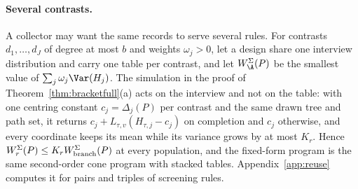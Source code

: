 \paragraph{Several contrasts.}
A collector may want the same records to serve several rules. For contrasts $d_1,\ldots,d_J$ of degree at most $b$ and weights $\omega_j>0$, let a design share one interview distribution and carry one table per contrast, and let $W^{\Sigma}_\A(P)$ be the smallest value of $\sum_j\omega_j\Var(H_j)$. The simulation in the proof of Theorem~\ref{thm:bracketfull}(a) acts on the interview and not on the table: with one centring constant $c_j=\Delta_j(P)$ per contrast and the same drawn tree and path set, it returns $c_j+L_{\tau,v}(H_{\tau,j}-c_j)$ on completion and $c_j$ otherwise, and every coordinate keeps its mean while its variance grows by at most $K_r$. Hence $W^{\Sigma}_r(P)\le K_rW^{\Sigma}_{\rm branch}(P)$ at every population, and the fixed-form program is the same second-order cone program with stacked tables. Appendix~\ref{app:reuse} computes it for pairs and triples of screening rules.
